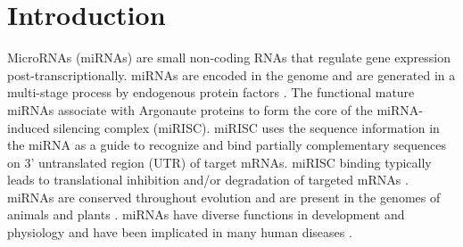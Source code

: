 \documentclass{bmcart}
\begin{document}


\section*{Introduction}
MicroRNAs (miRNAs) are small non-coding RNAs that regulate gene expression post-transcriptionally. miRNAs are encoded in the genome and are generated in a multi-stage process by endogenous protein factors \cite{finnegan2013microrna}. The functional mature miRNAs associate with Argonaute proteins to form the core of the miRNA-induced silencing complex (miRISC). miRISC uses the sequence information in the miRNA as a guide to recognize and bind partially complementary sequences on 3' untranslated region (UTR) of target mRNAs. miRISC binding typically leads to translational inhibition and/or degradation of targeted mRNAs \cite{huntzinger2011gene}. 
miRNAs are conserved throughout evolution and are present in the genomes of animals and plants \cite{kozomara2013mirbase}. miRNAs have diverse functions in development and physiology and have been implicated in many human diseases \cite{rupaimoole2017microrna}.
\end{document}
